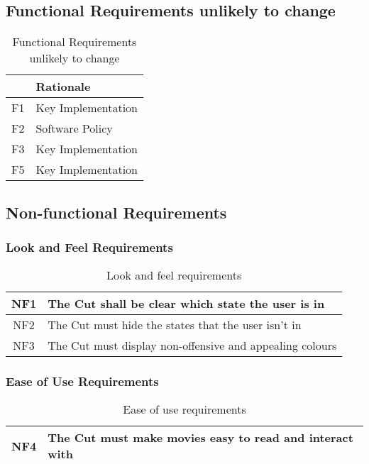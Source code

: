 \documentclass[titlepage]{article}
\begin{document}
\subsection{Functional Requirements unlikely to change}
\begin{table}[H]
    \centering
    \begin{tabularx}{\textwidth}{|c|X|} \hline
         & \textbf{Rationale} \\ \hline
        F1 & Key Implementation \\ \hline
        F2 & Software Policy \\ \hline
        F3 & Key Implementation\\ \hline
        F5 & Key Implementation \\ \hline
    \end{tabularx}
    \caption{Functional Requirements unlikely to change}
    \label{tab:Functional_unlikely}
\end{table}

\subsection{Non-functional Requirements}
\subsubsection{Look and Feel Requirements}
\begin{table}[H]
    \centering
    \begin{tabularx}{\textwidth}{|c|X|} \hline
        NF1 & The Cut shall be clear which state the user is in \\ \hline
        NF2 & The Cut must hide the states that the user isn't in \\ \hline
        NF3 & The Cut must display non-offensive and appealing colours \\ \hline
    \end{tabularx}
    \caption{Look and feel requirements}
    \label{tab:NonFunctional-look and feel}
\end{table}

\subsubsection{Ease of Use Requirements}
\begin{table}[H]
    \centering
    \begin{tabularx}{\textwidth}{|c|X|} \hline
        NF4 & The Cut must make movies easy to read and interact with \\ \hline
    \end{tabularx}
    \caption{Ease of use requirements}
    \label{tab:NonFunctional-ease of use}
\end{table}
\end{document}

